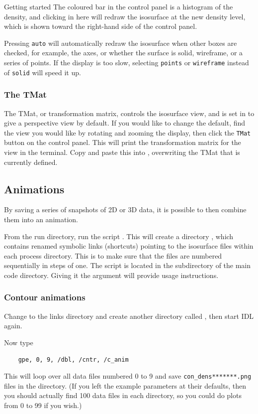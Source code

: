 \begin{chapter}{\label{cha:quickstart}Getting started}
  The coloured bar in the control panel is a histogram of the density, and
  clicking in here will redraw the isosurface at the new density level, which
  is shown toward the right-hand side of the control panel.

  Pressing \verb"auto" will automatically redraw the isosurface when other
  boxes are checked, for example, the axes, or whether the surface is solid,
  wireframe, or a series of points.  If the display is too slow, selecting
  \verb"points" or \verb"wireframe" instead of \verb"solid" will speed it up.

  \subsubsection{The TMat}
  The TMat, or transformation matrix, controls the isosurface view, and is set
  in  to give a perspective view by default.  If you would
  like to change the default, find the view you would like by rotating and
  zooming the display, then click the \verb"TMat" button on the control panel.
  This will print the transformation matrix for the view in the terminal.  Copy
  and paste this into , overwriting the TMat that is currently
  defined.

  \subsection{Animations}
  By saving a series of snapshots of 2D or 3D data, it is possible to then
  combine them into an animation.

  From the run directory, run the script .  This will
  create a directory , which contains renamed symbolic links
  (shortcuts) pointing to the isosurface files within each process directory.
  This is to make sure that the files are numbered sequentially in steps of
  one.  The  script is located in the 
  subdirectory of the main code directory.  Giving it the argument
   will provide usage instructions.

  \subsubsection{Contour animations}
  Change to the links directory and create another directory called
  , then start IDL again.

  Now type
  \begin{Verbatim}
    gpe, 0, 9, /dbl, /cntr, /c_anim
  \end{Verbatim}
  This will loop over all data files numbered 0 to 9 and save
  \verb"con_dens*******.png" files in the  directory.  (If you
  left the  example parameters at their defaults, then you
  should actually find 100 data files in each  directory, so you
  could do plots from 0 to 99 if you wish.)


\end{chapter}
